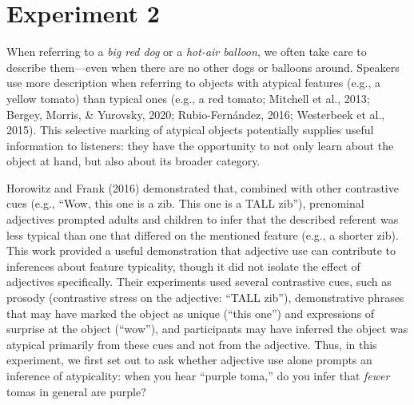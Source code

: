 \documentclass[
  english,
  man,floatsintext]{apa6}
\begin{document}
\hypertarget{experiment-2}{%
\section{Experiment 2}\label{experiment-2}}

When referring to a \emph{big red dog} or a \emph{hot-air balloon}, we often take care to describe them---even when there are no other dogs or balloons around. Speakers use more description when referring to objects with atypical features (e.g., a yellow tomato) than typical ones (e.g., a red tomato; Mitchell et al., 2013; Bergey, Morris, \& Yurovsky, 2020; Rubio-Fernández, 2016; Westerbeek et al., 2015). This selective marking of atypical objects potentially supplies useful information to listeners: they have the opportunity to not only learn about the object at hand, but also about its broader category.

Horowitz and Frank (2016) demonstrated that, combined with other contrastive cues (e.g., ``Wow, this one is a zib. This one is a TALL zib''), prenominal adjectives prompted adults and children to infer that the described referent was less typical than one that differed on the mentioned feature (e.g., a shorter zib). This work provided a useful demonstration that adjective use can contribute to inferences about feature typicality, though it did not isolate the effect of adjectives specifically. Their experiments used several contrastive cues, such as prosody (contrastive stress on the adjective: ``TALL zib''), demonstrative phrases that may have marked the object as unique (``this one'') and expressions of surprise at the object (``wow''), and participants may have inferred the object was atypical primarily from these cues and not from the adjective. Thus, in this experiment, we first set out to ask whether adjective use alone prompts an inference of atypicality: when you hear ``purple toma,'' do you infer that \emph{fewer} tomas in general are purple?
\end{document}
